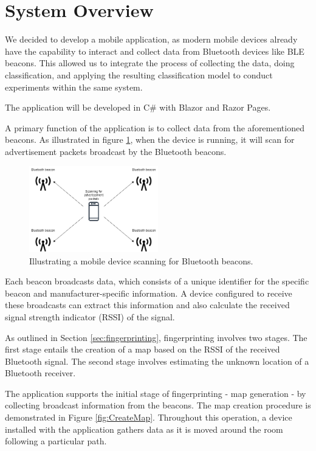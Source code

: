 \section{System Overview}\label{sec:system_overview}

We decided to develop a mobile application, as modern mobile devices already have the capability to interact and collect data from Bluetooth devices like BLE beacons. 
This allowed us to integrate the process of collecting the data, doing classification, and applying the resulting classification model to conduct experiments within the same system.

The application will be developed in C\#\cite{billwagnerDocsGetStarted} with Blazor\cite{BlazorBuildClient} and Razor Pages\cite{tdykstraIntroductionRazorPages2023}.

A primary function of the application is to collect data from the aforementioned beacons. 
As illustrated in figure \ref{fig:ScanAdvertisement}, when the device is running, it will scan for advertisement packets broadcast by the Bluetooth beacons.

\begin{figure}[H]
    \centering
    \includegraphics[width=0.5\textwidth]{images/ScanningForAdvertisement.drawio.png}
    \caption{Illustrating a mobile device scanning for Bluetooth beacons.}
    \label{fig:ScanAdvertisement}
\end{figure}

Each beacon broadcasts data, which consists of a unique identifier for the specific beacon and manufacturer-specific information.
A device configured to receive these broadcasts can extract this information and also calculate the received signal strength indicator (RSSI) of the signal.

As outlined in Section \ref{sec:fingerprinting}, fingerprinting involves two stages.
The first stage entails the creation of a map based on the RSSI of the received Bluetooth signal. The second stage involves estimating the unknown location of a Bluetooth receiver.

The application supports the initial stage of fingerprinting - map generation - by collecting broadcast information from the beacons. 
The map creation procedure is demonstrated in Figure \ref{fig:CreateMap}. 
Throughout this operation, a device installed with the application gathers data as it is moved around the room following a particular path.

